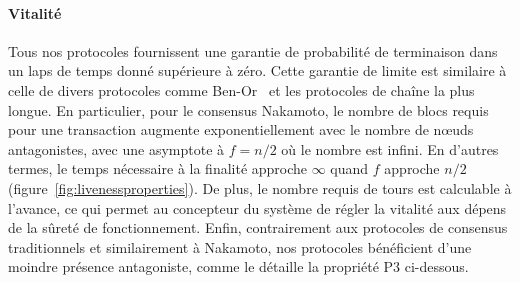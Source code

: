 \documentclass[a4,twocolumn,10pt]{article}
\newcommand{\tronly}[2]{#1}
\theoremstyle{definition}
\begin{document}
\paragraph{Vitalité} Tous nos protocoles fournissent une garantie de probabilité de terminaison dans un laps de temps donné supérieure à zéro.
Cette garantie de limite est similaire à celle de divers protocoles comme Ben-Or~\cite{ben1983another} et les protocoles de chaîne la plus longue.
En particulier, pour le consensus Nakamoto, le nombre de blocs requis pour une transaction augmente exponentiellement avec le nombre de nœuds antagonistes, avec une asymptote à $f = n/2$ où le nombre est infini. %
En d'autres termes, le temps nécessaire à la finalité approche $\infty$ quand $f$ approche $n/2$\tronly{ (figure~\ref{fig:livenessproperties}).}{.}
De plus, le nombre requis de tours est calculable à l'avance, ce qui permet au concepteur du système de régler la vitalité aux dépens de la sûreté de fonctionnement. Enfin, contrairement aux protocoles de consensus traditionnels et similairement à Nakamoto, nos protocoles bénéficient d'une moindre présence antagoniste, comme le détaille la propriété P3 ci-dessous.
\end{document}
